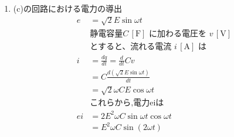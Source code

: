 \documentclass[twocolumn]{article}
\begin{document}
\begin{enumerate}
  \item (c)の回路における電力の導出
    \begin{align*}
    e &=\sqrt{2}E\sin\omega t\\
    &\text{静電容量} C\,[\text{F}] \text{ に加わる電圧を } v\,[\text{V}] \\
    &\text{とすると、流れる電流 } i\,[\text{A}] \text{ は} \\
    i   &= \frac{dq}{dt} = \frac{d}{dt}Cv \\
        &= C \frac{d \left(\sqrt{2}E\sin \omega t\right)}{dt} \\
        &= \sqrt{2}\omega CE\cos\omega t\\
    &\text{これらから,電力eiは}\\
    ei &= 2E^2 \omega C \sin\omega t \cos \omega t \\ 
    &= E^2 \omega C \sin \left(2 \omega t\right)\\
    \end{align*}


\end{enumerate}
\end{document}
